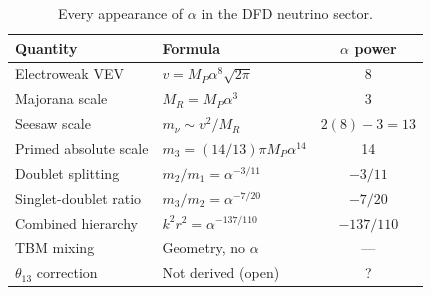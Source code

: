 \documentclass[11pt,a4paper]{article}
\begin{document}
\begin{table}[H]
\centering
\small
\caption{Every appearance of $\alpha$ in the DFD neutrino sector.}
\begin{tabular}{llc}
\toprule
\textbf{Quantity} & \textbf{Formula} & \textbf{$\alpha$ power} \\
\midrule
Electroweak VEV & $v = M_P \alpha^8 \sqrt{2\pi}$ & 8 \\
Majorana scale & $M_R = M_P \alpha^3$ & 3 \\
Seesaw scale & $m_\nu \sim v^2/M_R$ & $2(8) - 3 = 13$ \\
Primed absolute scale & $m_3 = (14/13)\pi M_P \alpha^{14}$ & 14 \\
Doublet splitting & $m_2/m_1 = \alpha^{-3/11}$ & $-3/11$ \\
Singlet-doublet ratio & $m_3/m_2 = \alpha^{-7/20}$ & $-7/20$ \\
Combined hierarchy & $k^2 r^2 = \alpha^{-137/110}$ & $-137/110$ \\
TBM mixing & Geometry, no $\alpha$ & --- \\
$\theta_{13}$ correction & Not derived (open) & ? \\
\bottomrule
\end{tabular}
\end{table}
\end{document}
